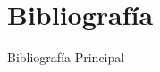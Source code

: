 \section{Bibliografía}

\begin{frame}{Bibliografía Principal}

	\printbibliography[keyword={importante}]

\end{frame}
